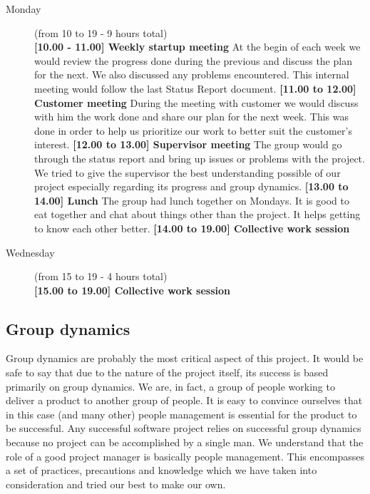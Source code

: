 \begin{description}

\item[Monday] (from 10 to 19 - 9 hours total) \\
\textbf{[10.00 - 11.00] Weekly startup meeting}\newline
At the begin of each week we would review the progress done during the previous and discuss the plan for the next.
We also discussed any problems encountered.
This internal meeting would follow the last Status Report document.
\newline\textbf{[11.00 to 12.00] Customer meeting}\newline
During the meeting with customer we would discuss with him the work done and share our plan for the next week.
This was done in order to help us prioritize our work to better suit the customer's interest.
\newline\textbf{[12.00 to 13.00] Supervisor meeting}\newline
The group would go through the status report and bring up issues or problems with the project.
We tried to give the supervisor the best understanding possible of our project especially regarding
its progress and group dynamics.
\newline\textbf{[13.00 to 14.00] Lunch}\newline
The group had lunch together on Mondays. It is good to eat together and chat about things other than the project.
It helps getting to know each other better.
\newline\textbf{[14.00 to 19.00] Collective work session}

\item[Wednesday] (from 15 to 19 - 4 hours total) \\
\textbf{[15.00 to 19.00] Collective work session}
\end{description}

\subsection{Group dynamics}
\label{section:dynamics}

Group dynamics are probably the most critical aspect of this project.
It would be safe to say that due to the nature of the project itself, its success is based primarily on group dynamics.
We are, in fact, a group of people working to deliver a product to another group of people.
It is easy to convince ourselves that in this case (and many other) people management is essential for the product to be successful.
Any successful software project relies on successful group dynamics because no project can be accomplished by a single man.
We understand that the role of a good project manager is basically people management.
This encompasses a set of practices, precautions and knowledge which we have taken into consideration and tried our
best to make our own.

